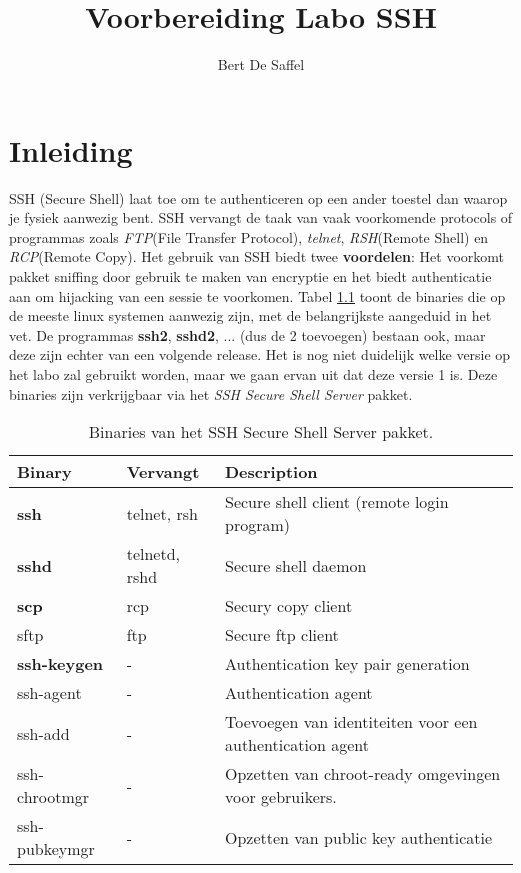 \documentclass{report}
\let\oldmaketitle\maketitle
\renewcommand{\maketitle}{\oldmaketitle}
\begin{document}
	\title{Voorbereiding Labo SSH}
	\author{Bert De Saffel}
	\maketitle
	\tableofcontents
	
	\chapter{Inleiding}
	SSH (Secure Shell) laat toe om te authenticeren op een ander toestel dan waarop je fysiek aanwezig bent. SSH vervangt de taak van vaak voorkomende protocols of programmas zoals \textit{FTP}(File Transfer Protocol), \textit{telnet}, \textit{RSH}(Remote Shell) en \textit{RCP}(Remote Copy).
	Het gebruik van SSH biedt twee \textbf{voordelen}: Het voorkomt pakket sniffing door gebruik te maken van encryptie en het biedt authenticatie aan om hijacking van een sessie te voorkomen. Tabel \ref{table:binaries} toont de binaries die op de meeste linux systemen aanwezig zijn, met de belangrijkste aangeduid in het vet. De programmas \textbf{ssh2}, \textbf{sshd2}, ... (dus de 2 toevoegen) bestaan ook, maar deze zijn echter van een volgende release. Het is nog niet duidelijk welke versie op het labo zal gebruikt worden, maar we gaan ervan uit dat deze versie 1 is. Deze binaries zijn verkrijgbaar via het \textit{SSH Secure Shell Server} pakket.
	\begin{table}[h]
		\begin{tabular}{l | l | l}
			\textbf{Binary} & \textbf{Vervangt} & \textbf{Description} \\
			\hline
			\textbf{ssh} & telnet, rsh & Secure shell client (remote login program) \\
			\textbf{sshd} & telnetd, rshd & Secure shell daemon \\
			\textbf{scp} & rcp & Secury copy client \\
			sftp & ftp & Secure ftp client \\
			\textbf{ssh-keygen} & - & Authentication key pair generation \\
			ssh-agent & - & Authentication agent \\
			ssh-add & - & Toevoegen van identiteiten voor een authentication agent \\
			ssh-chrootmgr & - & Opzetten van chroot-ready omgevingen voor gebruikers. \\
			ssh-pubkeymgr & - & Opzetten van public key authenticatie
		\end{tabular}
	\caption{Binaries van het SSH Secure Shell Server pakket.} 
	\label{table:binaries}
	\end{table}
	
\end{document}
